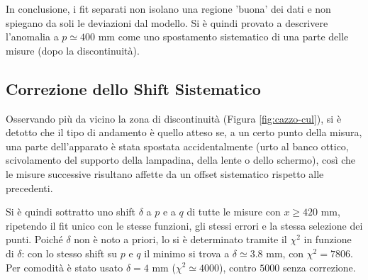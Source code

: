 \documentclass[10pt,twocolumn]{article}
\begin{document}
\begin{table}[h]
    \centering
    \small
    \caption{Analisi dei residui dei fit separati.}
    \label{tab:residui_split}
\end{table}
 
\noindent In conclusione, i fit separati non isolano una regione 'buona' dei dati e non spiegano da soli le deviazioni dal modello.
Si è quindi provato a descrivere l'anomalia a $p\simeq400$ mm come uno spostamento sistematico di una parte delle misure (dopo la discontinuità).
 

\subsection{Correzione dello Shift Sistematico} 
Osservando più da vicino la zona di discontinuità (Figura \ref{fig:cazzo-cul}), si è detotto che il tipo di andamento è quello atteso se, a un certo punto della misura, una parte dell'apparato è stata spostata accidentalmente (urto al banco ottico, scivolamento del supporto della lampadina, della lente o dello schermo), così che le misure successive risultano affette da un offset sistematico rispetto alle precedenti.

\noindent Si è quindi sottratto uno shift $\delta$ a $p$ e a $q$ di tutte le misure con $x\geq 420$ mm, ripetendo il fit unico con le stesse funzioni, gli stessi errori e la stessa selezione dei punti. Poiché $\delta$ non è noto a priori, lo si è determinato tramite il $\chi^2$ in funzione di $\delta$: con lo stesso shift su $p$ e $q$ il minimo si trova a $\delta\simeq3.8$ mm, con $\chi^2=7806$. Per comodità è stato usato $\delta=4$ mm ($\chi^2 \simeq 4000 $), contro $5000$ senza correzione. 
\end{document}
